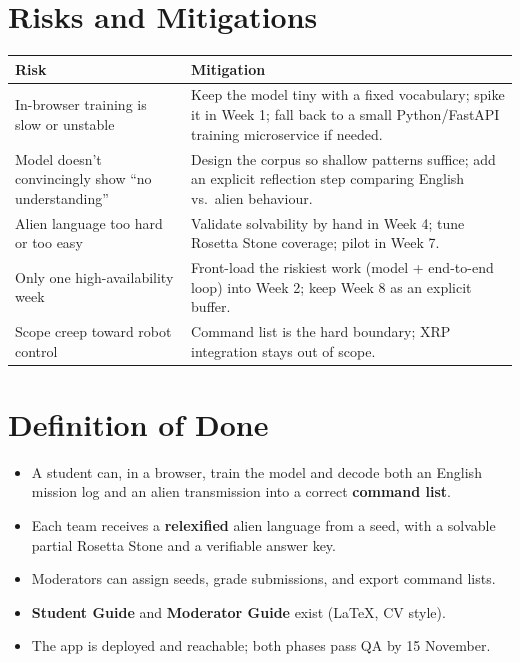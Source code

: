 \documentclass[a4]{article}
\begin{document}
\section{Risks and Mitigations}

\begin{center}
\renewcommand{\arraystretch}{1.25}
\begin{tabularx}{\linewidth}{@{}p{4.6cm}X@{}}
\toprule
\textbf{Risk} & \textbf{Mitigation} \\
\midrule
In-browser training is slow or unstable &
Keep the model tiny with a fixed vocabulary; spike it in Week 1; fall back to a
small Python/FastAPI training microservice if needed. \\

Model doesn't convincingly show ``no understanding'' &
Design the corpus so shallow patterns suffice; add an explicit reflection step
comparing English vs.\ alien behaviour. \\

Alien language too hard or too easy &
Validate solvability by hand in Week 4; tune Rosetta Stone coverage; pilot in
Week 7. \\

Only one high-availability week &
Front-load the riskiest work (model + end-to-end loop) into Week 2; keep Week 8
as an explicit buffer. \\

Scope creep toward robot control &
Command list is the hard boundary; XRP integration stays out of scope. \\
\bottomrule
\end{tabularx}
\end{center}

\section{Definition of Done}

\begin{itemize}[leftmargin=*, itemsep=1pt]
    \item A student can, in a browser, train the model and decode both an English
    mission log and an alien transmission into a correct \textbf{command list}.
    \item Each team receives a \textbf{relexified} alien language from a seed, with
    a solvable partial Rosetta Stone and a verifiable answer key.
    \item Moderators can assign seeds, grade submissions, and export command lists.
    \item \textbf{Student Guide} and \textbf{Moderator Guide} exist (LaTeX, CV style).
    \item The app is deployed and reachable; both phases pass QA by 15 November.
\end{itemize}
\end{document}
